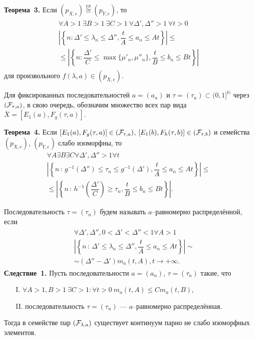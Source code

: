 \noindent\textbf{Теорема~3.}
Если 
$(p_{\overline{X},e})\stackrel{\text{сл}}{\cong}(p_{\overline{Y},e})$, то
\begin{eqnarray}
\begin{aligned}
\forall{A>1}\ \exists{B>1}\ \exists{C>1}\ \forall{\Delta', \Delta ''>1}\ \forall{t>0} \\
\left|\left\{
n:\Delta '\leqslant \lambda_n \leqslant \Delta'', \dfrac{t}{A} \leqslant a_n \leqslant At
\right\}\right| \leqslant  \\ \leqslant
\left|\left\{
n:\dfrac{\Delta'}{C}\leqslant \max\{\mu'_n,\mu''_n \}, \dfrac{t}{B} \leqslant b_n \leqslant Bt
\right\}\right|
\end{aligned} \label{Finv}
\end{eqnarray}
для произвольного $f(\lambda,a) \in (p_{\overline{X},e})$.

Для фиксированных последовательностей $a=(a_n)$ и $\tau  =(\tau_n)\subset (0,1]^{\mathbb N}$ через
$({\cal F}_{\tau ,a})$, в свою очередь, обозначим множество всех
пар вида $\overline{X}=[E_1(a),F_g(\tau  ,a)]$.

\noindent\textbf{Теорема~4.}
Если $[E_1(a),F_g(\tau  ,a)]\in ({\cal F}_{\tau  ,a})$, $[E_1(b),F_h(\tau  ,b)]\in ({\cal F}_{\tau  ,b})$ и семейства
$(p_{\overline{X},e})$, $(p_{\overline{Y},e})$ слабо изоморфны, то
\begin{eqnarray*}
\forall{A}\exists{B}\exists{C}\forall{\Delta ',\Delta ''>1} \forall{t}\\
\left|\left\{
n\,:\,g^{-1}(\Delta '') \leqslant \tau_n \leqslant g^{-1}(\Delta'),\dfrac{t}{A}\leqslant a_n \leqslant At
\right\}\right|\leqslant\\ \leqslant
\left|\left\{
n\,:\,h^{-1}\left(\dfrac{\Delta'}{C}\right)\geqslant \tau_n ,\dfrac{t}{B}\leqslant b_n \leqslant Bt
\right\}\right|.
\end{eqnarray*}

Последовательность $\tau  =(\tau_n)$ будем называть $a$--равномерно распределённой, если
\begin{eqnarray}
\begin{aligned}
&&\forall{\Delta ',\Delta '',0<\Delta '<\Delta ''<1} \forall{A>1} \\
&&\left|\left\{ n\,:\, \Delta '\leqslant \lambda_n \leqslant \Delta '',
\dfrac{t}{A}\leqslant a_n\leqslant At\right\}\right|\sim \\ 
&&\sim
(\Delta ''-\Delta ')m_a(t,A), t\to+\infty .
\end{aligned}\nonumber
\end{eqnarray}
\noindent\textbf{Следствие~1.}
Пусть последовательности $a=(a_n)$, $\tau=(\tau_n)$ такие, что
\begin{itemize}
\item[I.] $\forall{A>1, B>1}\ \exists{C>1:}\forall{t>0}\  m_a(t,A)\leqslant C m_a(t,B)$,
\item[II.] последовательность $\tau=(\tau_n)$ --- $a$--равномерно распределённая.
\end{itemize}
Тогда в семействе
пар $({\cal F}_{\lambda ,a})$ существует континуум парно не слабо изоморфных элементов.

